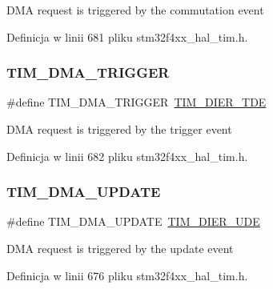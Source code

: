 D\+MA request is triggered by the commutation event 

Definicja w linii 681 pliku stm32f4xx\+\_\+hal\+\_\+tim.\+h.

\mbox{\label{group___t_i_m___d_m_a__sources_ga21912fd910242e0f63bf9b0953e41c63}} 
\subsubsection{\texorpdfstring{T\+I\+M\+\_\+\+D\+M\+A\+\_\+\+T\+R\+I\+G\+G\+ER}{TIM\_DMA\_TRIGGER}}
{\footnotesize\ttfamily \#define T\+I\+M\+\_\+\+D\+M\+A\+\_\+\+T\+R\+I\+G\+G\+ER~\hyperlink{group___peripheral___registers___bits___definition_ga5a752d4295f100708df9b8be5a7f439d}{T\+I\+M\+\_\+\+D\+I\+E\+R\+\_\+\+T\+DE}}

D\+MA request is triggered by the trigger event 

Definicja w linii 682 pliku stm32f4xx\+\_\+hal\+\_\+tim.\+h.

\mbox{\label{group___t_i_m___d_m_a__sources_ga45816ad15a4f533027eb202ac0b9aaf5}} 
\subsubsection{\texorpdfstring{T\+I\+M\+\_\+\+D\+M\+A\+\_\+\+U\+P\+D\+A\+TE}{TIM\_DMA\_UPDATE}}
{\footnotesize\ttfamily \#define T\+I\+M\+\_\+\+D\+M\+A\+\_\+\+U\+P\+D\+A\+TE~\hyperlink{group___peripheral___registers___bits___definition_gab9f47792b1c2f123464a2955f445c811}{T\+I\+M\+\_\+\+D\+I\+E\+R\+\_\+\+U\+DE}}

D\+MA request is triggered by the update event 

Definicja w linii 676 pliku stm32f4xx\+\_\+hal\+\_\+tim.\+h.

